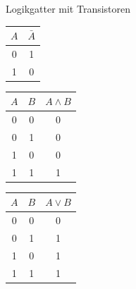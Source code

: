 \begin{defi}{Logikgatter mit Transistoren}
    \begin{minipage}[t]{0.33\textwidth}
        \begin{center}
            \begin{tabular}{|c||c|}
                \hline
                $A$ & $\bar{A}$ \\\hline\hline
                0   & 1         \\\hline
                1   & 0         \\\hline
            \end{tabular}
        \end{center}
    \end{minipage}
    \begin{minipage}[t]{0.33\textwidth}
        \begin{center}
            \begin{tabular}{|c|c||c|}
                \hline
                $A$ & $B$ & $A \land B$ \\\hline\hline
                0   & 0   & 0           \\\hline
                0   & 1   & 0           \\\hline
                1   & 0   & 0           \\\hline
                1   & 1   & 1           \\\hline
            \end{tabular}
        \end{center}
    \end{minipage}
    \begin{minipage}[t]{0.33\textwidth}
        \begin{center}
            \begin{tabular}{|c|c||c|}
                \hline
                $A$ & $B$ & $A \lor B$ \\\hline\hline
                0   & 0   & 0          \\\hline
                0   & 1   & 1          \\\hline
                1   & 0   & 1          \\\hline
                1   & 1   & 1          \\\hline
            \end{tabular}
        \end{center}
    \end{minipage}
\end{defi}

